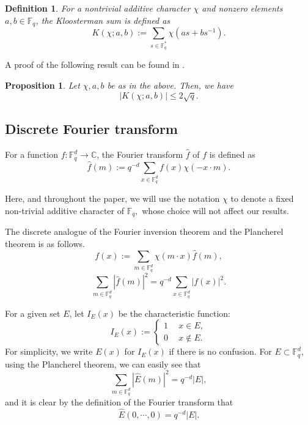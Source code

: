 \documentclass[a4paper,11pt]{amsart}
\numberwithin{equation}{section}
\newtheorem{proposition}[theorem]{Proposition}
\newtheorem{definition}[theorem]{Definition}
\def\Fq#1{\mathbb{F}_q^{#1}}
\def\pnorm#1#2{|#2|_{#1}}
\begin{document}
\begin{definition}
    
For a nontrivial additive character  $\chi$ and  nonzero elements $a,b \in \Fq{}$, the Kloosterman sum is defined as
\[K(\chi;a,b) := \displaystyle\sum_{s \in \Fq{*}} \chi(as + bs^{-1}).\]
\end{definition}
A proof of the following result can be found in \cite{We48}. 
\begin{proposition}\label{KLsum}
Let $\chi, a, b$ be as in the above. Then, we have
\begin{equation}\label{KSTM}
	|K(\chi;a,b)| \leq 2\sqrt{q}.
\end{equation}
\end{proposition}

\subsection{Discrete Fourier transform} 
For a function $f : \Fq{d} \rightarrow \mathbb{C}$, the Fourier transform $\widehat{f}$ of $f$ is defined as
\begin{equation}\label{FT}
\widehat{f}(m) := q^{-d}\sum_{x \in \Fq{d}} f(x) \chi (-x \cdot m).
\end{equation}

Here, and throughout the paper,  we will use the notation $\chi$ to denote a fixed non-trivial additive character of $\mathbb F_q,$  whose choice will not affect our results. 

The discrete analogue of the Fourier inversion theorem and the Plancherel theorem is as follows.
\begin{equation}
f(x) := \sum_{m \in \Fq{d}}\chi(m \cdot x)\widehat{f}(m),
\end{equation}
\begin{equation}
\sum_{m \in \Fq{d}} \left|{\widehat{f}(m)}\right|^2 = q^{-d}\sum_{x \in \Fq{d}} \left|f(x)\right|^2.
\end{equation}

For a given set $E$, let $I_E(x)$ be the characteristic function:
\begin{equation*}
 I_E(x) :=
 \begin{cases}
 1 &~~x\in E, \\
 0 &~~ x\notin E.
 \end{cases}
\end{equation*}
For simplicity, we write $E(x)$ for $I_E(x)$ if there is no confusion. For $E \subset \Fq{d}$, using the Plancherel theorem, we can easily see that
\begin{equation}\label{PL1}
\sum_{m \in \Fq{d}}\pnorm{}{\widehat{E}(m)}^2 = q^{-d}|E|,
\end{equation}
and it is clear by the definition of the Fourier transform that
\begin{equation}\label{PL2}
\widehat{E}(0,\cdots,0) = q^{-d}|E|.
\end{equation}
\end{document}
